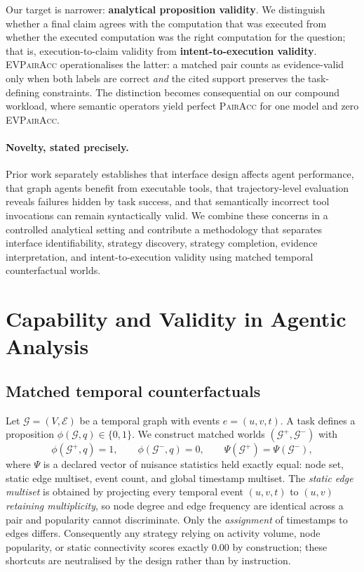 \documentclass[sigconf,anonymous,review]{acmart}
\newcommand{\pairacc}{\textsc{PairAcc}}
\newcommand{\evpair}{\textsc{EVPairAcc}}
\newcommand{\Gp}{\mathcal{G}^{+}}
\newcommand{\Gm}{\mathcal{G}^{-}}
\begin{document}
Our target is narrower: \textbf{analytical proposition validity}. We distinguish whether a final
claim agrees with the computation that was executed from whether the executed computation was the
right computation for the question; that is, execution-to-claim validity from
\textbf{intent-to-execution validity}. \evpair{} operationalises the latter: a matched pair counts
as evidence-valid only when both labels are correct \emph{and} the cited support preserves the
task-defining constraints. The distinction becomes consequential on our compound workload, where
semantic operators yield perfect \pairacc{} for one model and zero \evpair{}.

\paragraph{Novelty, stated precisely.}
Prior work separately establishes that interface design affects agent performance, that graph
agents benefit from executable tools, that trajectory-level evaluation reveals failures hidden by
task success, and that semantically incorrect tool invocations can remain syntactically valid. We
combine these concerns in a controlled analytical setting and contribute a methodology that
separates interface identifiability, strategy discovery, strategy completion, evidence
interpretation, and intent-to-execution validity using matched temporal counterfactual worlds.


\section{Capability and Validity in Agentic Analysis}

\subsection{Matched temporal counterfactuals}
Let $\mathcal{G}=(V,\mathcal{E})$ be a temporal graph with events $e=(u,v,t)$. A task defines a
proposition $\phi(\mathcal{G},q)\in\{0,1\}$. We construct matched worlds $(\Gp,\Gm)$ with
\begin{equation}
\phi(\Gp,q)=1,\qquad \phi(\Gm,q)=0,\qquad \Psi(\Gp)=\Psi(\Gm),
\end{equation}
where $\Psi$ is a declared vector of nuisance statistics held exactly equal: node set, static edge
multiset, event count, and global timestamp multiset. The \emph{static edge multiset} is obtained
by projecting every temporal event $(u,v,t)$ to $(u,v)$ \emph{retaining multiplicity}, so node
degree and edge frequency are identical across a pair and popularity cannot discriminate. Only the \emph{assignment} of timestamps to
edges differs. Consequently any strategy relying on activity volume, node popularity, or static
connectivity scores exactly $0.00$ by construction; these shortcuts are neutralised by the
design rather than by instruction.
\end{document}
